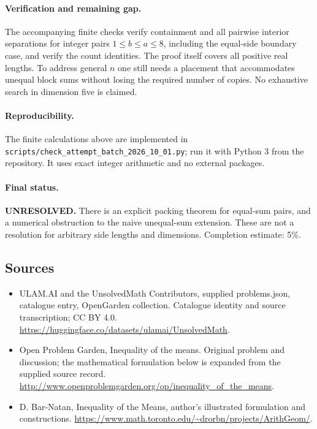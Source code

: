 \documentclass[11pt,a4paper]{article}
\begin{document}
\paragraph{Verification and remaining gap.}
The accompanying finite checks verify containment and all pairwise interior
separations for integer pairs $1\le b\le a\le8$, including the equal-side
boundary case, and verify the count identities. The proof itself covers
all positive real lengths. To address general $n$ one still needs a placement
that accommodates unequal block sums without losing the required number of
copies. No exhaustive search in dimension five is claimed.

\paragraph{Reproducibility.}
The finite calculations above are implemented in
\texttt{scripts/check\_attempt\_batch\_2026\_10\_01.py}; run it with Python 3
from the repository. It uses exact integer arithmetic and no external packages.

\paragraph{Final status.}
\textbf{UNRESOLVED.} There is an explicit packing theorem for equal-sum pairs,
and a numerical obstruction to the naive unequal-sum extension. These are
not a resolution for arbitrary side lengths and dimensions. Completion
estimate: 5\%.

\subsection{Sources}
\begin{itemize}
\item[S1] ULAM.AI and the UnsolvedMath Contributors, supplied problems.json, catalogue entry, OpenGarden collection. Catalogue identity and source transcription; CC BY 4.0.
\url{https://huggingface.co/datasets/ulamai/UnsolvedMath}.
\item[S2] Open Problem Garden, Inequality of the means. Original problem and discussion; the mathematical formulation below is expanded from the supplied source record.
\url{http://www.openproblemgarden.org/op/inequality_of_the_means}.
\item[S3] D. Bar-Natan, Inequality of the Means, author’s illustrated formulation and constructions.
\url{https://www.math.toronto.edu/~drorbn/projects/ArithGeom/}.

\end{itemize}
\end{document}
